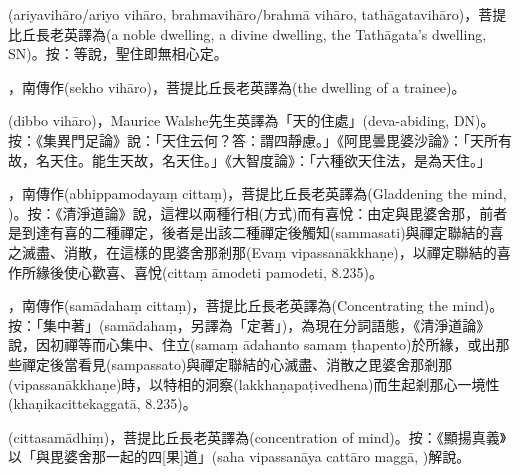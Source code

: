 \startitemgroup[noteitems]
\item{}(ariyavihāro/ariyo vihāro, brahmavihāro/brahmā vihāro, tathāgatavihāro)，菩提比丘長老英譯為(a noble dwelling, a divine dwelling, the Tathāgata's dwelling, SN)。按：等說，聖住即無相心定。
\item{}，南傳作(sekho vihāro)，菩提比丘長老英譯為(the dwelling of a trainee)。
\item{}(dibbo vihāro)，Maurice Walshe先生英譯為「天的住處」(deva-abiding, DN)。按：《集異門足論》說：「天住云何？答：謂四靜慮。」《阿毘曇毘婆沙論》：「天所有故，名天住。能生天故，名天住。」《大智度論》：「六種欲天住法，是為天住。」
\stopitemgroup

\startitemgroup[noteitems]
\item{}，南傳作(abhippamodayaṃ cittaṃ)，菩提比丘長老英譯為(Gladdening the mind, )。按：《清淨道論》說，這裡以兩種行相(方式)而有喜悅：由定與毘婆舍那，前者是到達有喜的二種禪定，後者是出該二種禪定後觸知(sammasati)與禪定聯結的喜之滅盡、消散，在這樣的毘婆舍那剎那(Evaṃ vipassanākkhaṇe)，以禪定聯結的喜作所緣後使心歡喜、喜悅(cittaṃ āmodeti pamodeti, 8.235)。
\stopitemgroup

\startitemgroup[noteitems]
\item{}，南傳作(samādahaṃ cittaṃ)，菩提比丘長老英譯為(Concentrating the mind)。按：「集中著」(samādahaṃ，另譯為「定著」)，為現在分詞語態，《清淨道論》說，因初禪等而心集中、住立(samaṃ ādahanto samaṃ ṭhapento)於所緣，或出那些禪定後當看見(sampassato)與禪定聯結的心滅盡、消散之毘婆舍那剎那(vipassanākkhaṇe)時，以特相的洞察(lakkhaṇapaṭivedhena)而生起剎那心一境性(khaṇikacittekaggatā, 8.235)。
\item{}(cittasamādhiṃ)，菩提比丘長老英譯為(concentration of mind)。按：《顯揚真義》以「與毘婆舍那一起的四[果]道」(saha vipassanāya cattāro maggā, )解說。
\stopitemgroup

